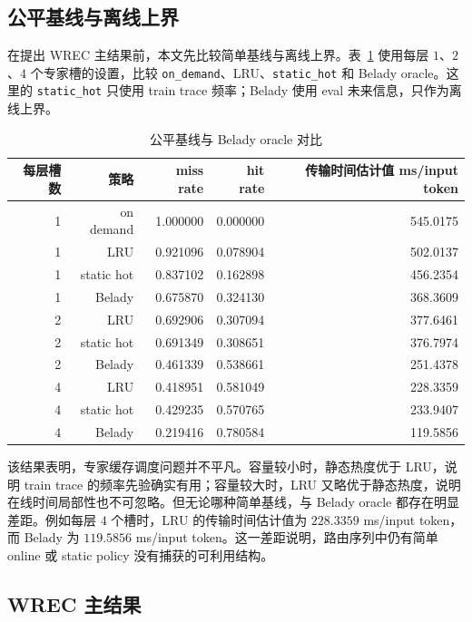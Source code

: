 \subsection{公平基线与离线上界}

在提出 WREC 主结果前，本文先比较简单基线与离线上界。表~\ref{tab:fair-baselines} 使用每层 $1$、$2$、$4$ 个专家槽的设置，比较 \texttt{on\_demand}、LRU、\texttt{static\_hot} 和 Belady oracle。这里的 \texttt{static\_hot} 只使用 train trace 频率；Belady 使用 eval 未来信息，只作为离线上界。

\begin{table}[ht]
    \centering
    \caption{\label{tab:fair-baselines}公平基线与 Belady oracle 对比}
    \begin{tabularx}{\linewidth}{rrrrr}
        \hline
        每层槽数 & 策略 & miss rate & hit rate & 传输时间估计值 ms/input token \\ \hline
        1 & on demand & 1.000000 & 0.000000 & 545.0175 \\ \hline
        1 & LRU & 0.921096 & 0.078904 & 502.0137 \\ \hline
        1 & static hot & 0.837102 & 0.162898 & 456.2354 \\ \hline
        1 & Belady & 0.675870 & 0.324130 & 368.3609 \\ \hline
        2 & LRU & 0.692906 & 0.307094 & 377.6461 \\ \hline
        2 & static hot & 0.691349 & 0.308651 & 376.7974 \\ \hline
        2 & Belady & 0.461339 & 0.538661 & 251.4378 \\ \hline
        4 & LRU & 0.418951 & 0.581049 & 228.3359 \\ \hline
        4 & static hot & 0.429235 & 0.570765 & 233.9407 \\ \hline
        4 & Belady & 0.219416 & 0.780584 & 119.5856 \\ \hline
    \end{tabularx}
\end{table}

该结果表明，专家缓存调度问题并不平凡。容量较小时，静态热度优于 LRU，说明 train trace 的频率先验确实有用；容量较大时，LRU 又略优于静态热度，说明在线时间局部性也不可忽略。但无论哪种简单基线，与 Belady oracle 都存在明显差距。例如每层 $4$ 个槽时，LRU 的传输时间估计值为 $228.3359$ ms/input token，而 Belady 为 $119.5856$ ms/input token。这一差距说明，路由序列中仍有简单 online 或 static policy 没有捕获的可利用结构。

\subsection{WREC 主结果}

